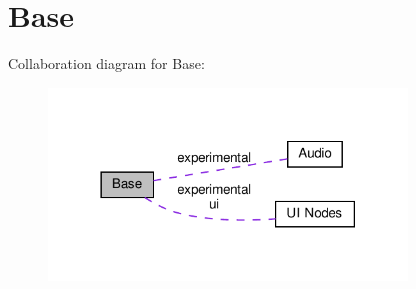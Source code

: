 \hypertarget{group__base}{}\section{Base}
\label{group__base}
Collaboration diagram for Base\+:
\nopagebreak
\begin{figure}[H]
\begin{center}
\leavevmode
\includegraphics[width=270pt]{group__base}
\end{center}
\end{figure}
